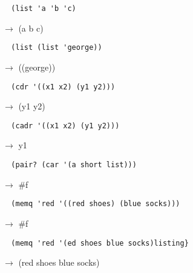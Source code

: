\documentclass[a4paper,12pt]{article}
\begin{document}
\begin{lstlisting}
  (list 'a 'b 'c)
\end{lstlisting}
$\rightarrow$ (a b c)
\begin{lstlisting}
  (list (list 'george))
\end{lstlisting}
$\rightarrow$ ((george))
\begin{lstlisting}
  (cdr '((x1 x2) (y1 y2)))
\end{lstlisting}
$\rightarrow$ (y1 y2)
\begin{lstlisting}
  (cadr '((x1 x2) (y1 y2)))
\end{lstlisting}
$\rightarrow$ y1
\begin{lstlisting}
  (pair? (car '(a short list)))
\end{lstlisting}
$\rightarrow$ \#f
\begin{lstlisting}
  (memq 'red '((red shoes) (blue socks)))
\end{lstlisting}
$\rightarrow$ \#f
\begin{lstlisting}
  (memq 'red '(ed shoes blue socks)listing}
\end{lstlisting}
$\rightarrow$ (red shoes blue socks)
\end{document}
